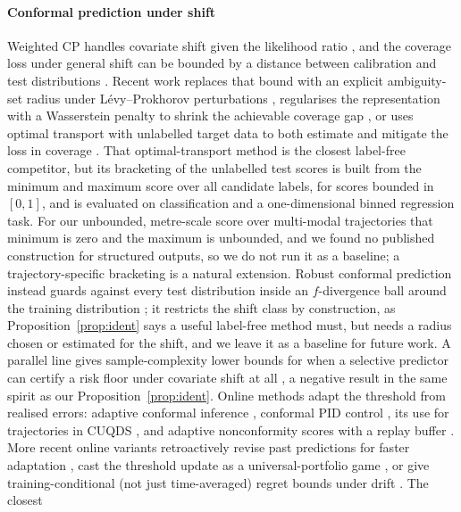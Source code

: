 \paragraph{Conformal prediction under shift}
Weighted CP handles covariate shift given the likelihood ratio \cite{tibshirani2019covariate}, and the coverage loss
under general shift can be bounded by a distance between calibration and test distributions \cite{barber2023beyond}.
Recent work replaces that bound with an explicit ambiguity-set radius under L\'{e}vy--Prokhorov perturbations
\cite{aolaritei2025levy}, regularises the representation with a Wasserstein penalty to shrink the achievable coverage
gap \cite{xu2025wasserstein}, or uses optimal transport with unlabelled target data to both estimate and mitigate the
loss in coverage \cite{correia2025nonexchangeable}. That optimal-transport method is the closest label-free competitor,
but its bracketing of the unlabelled test scores is built from the minimum and maximum score over all candidate labels,
for scores bounded in $[0,1]$, and is evaluated on classification and a one-dimensional binned regression task. For our
unbounded, metre-scale score over multi-modal trajectories that minimum is zero and the maximum is unbounded, and we
found no published construction for structured outputs, so we do not run it as a baseline; a trajectory-specific
bracketing is a natural extension. Robust conformal prediction instead guards against every test distribution inside
an $f$-divergence ball around the training distribution \cite{cauchois2024robust}; it restricts the shift class by
construction, as Proposition~\ref{prop:ident} says a useful label-free method must, but needs a radius chosen or
estimated for the shift, and we leave it as a baseline for future work. A parallel line gives sample-complexity lower bounds for when a
selective predictor can certify a risk floor under covariate shift at all \cite{liu2026certify}, a negative result in
the same spirit as our Proposition~\ref{prop:ident}. Online methods adapt the threshold from realised errors:
adaptive conformal inference \cite{gibbs2021adaptive}, conformal PID control \cite{angelopoulos2023pid}, its use for
trajectories in CUQDS \cite{huang2025cuqds}, and adaptive nonconformity scores with a replay buffer
\cite{tumu2026adaptnc}. More recent online variants retroactively revise past predictions for faster adaptation
\cite{jun2026retrospective}, cast the threshold update as a universal-portfolio game \cite{liu2026portfolio}, or give
training-conditional (not just time-averaged) regret bounds under drift \cite{liang2026optimalregret}. The closest
